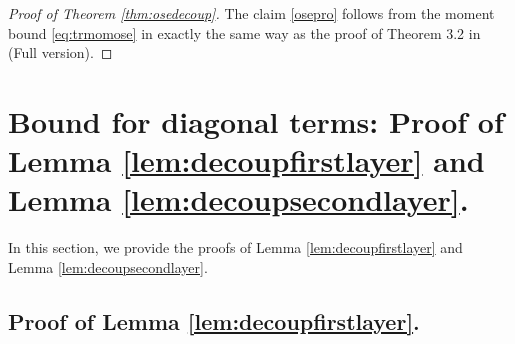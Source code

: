 \documentclass[11pt]{amsart}
\numberwithin{equation}{section}
\numberwithin{equation}{section}
\begin{document}
\begin{proof}[Proof of Theorem \ref{thm:osedecoup}]
The claim \eqref{osepro} follows from the moment bound \eqref{eq:trmomose} in exactly the same way as the proof of Theorem 3.2 in \cite{chenakkod2025optimal} (Full version). 
\end{proof}







\section{Bound for diagonal terms: Proof of Lemma \ref{lem:decoupfirstlayer} and Lemma \ref{lem:decoupsecondlayer}.} \label{sec:diagterms}

In this section, we provide the proofs of Lemma \ref{lem:decoupfirstlayer} and Lemma \ref{lem:decoupsecondlayer}. 

\subsection{Proof of Lemma \ref{lem:decoupfirstlayer}.}
\end{document}
